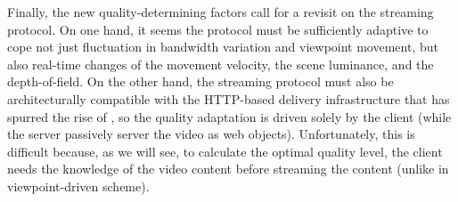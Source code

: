 Finally, the new quality-determining factors call for a revisit on the streaming protocol. 
On one hand, it seems the protocol must be sufficiently adaptive to cope not just fluctuation in bandwidth variation and viewpoint movement, but also real-time changes of the movement velocity, the scene luminance, and the depth-of-field. 
On the other hand, the streaming protocol must also be architecturally compatible with the HTTP-based delivery infrastructure that has spurred the rise of \vrvideos, so the quality adaptation is driven solely by the client (while the server passively server the video as web objects). 
Unfortunately, this is difficult because, as we will see, to calculate the optimal quality level, the client needs the knowledge of the video content before streaming the content (unlike in viewpoint-driven scheme). 




